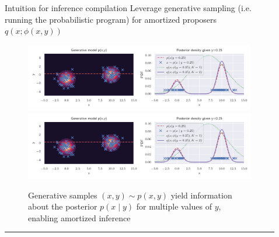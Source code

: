 \documentclass[final]{beamer}
\newlength{\sepwid}
\newlength{\onecolwid}
\newlength{\twocolwid}
\begin{document}
\begin{frame}[t,containsverbatim]
\begin{columns}[t]
\begin{column}{\onecolwid}
      \begin{block}{Intuition for inference compilation}
        Leverage generative sampling (i.e. running the probabilistic program)
        for amortized proposers $q(x;\phi(x,y))$
        \begin{figure}
          \includegraphics[width=\textwidth,trim=0 20 305 0,clip]{../Figures/intuition.pdf}
          \includegraphics[width=\textwidth,trim=305 10 0 10,clip]{../Figures/intuition.pdf}
          \caption{
            Generative samples $(x,y) \sim p(x,y)$ yield information about the posterior
            $p(x \mid y)$ for multiple values of $y$, enabling amortized inference
          }
        \end{figure}
      \end{block}


      \hrule~\\
      \begin{singlespace}
      \end{singlespace}

    \end{column} %

    \begin{column}{\sepwid}\end{column} %

    \begin{column}{\twocolwid} %



\end{column}
\end{columns}
\end{frame}
\end{document}
